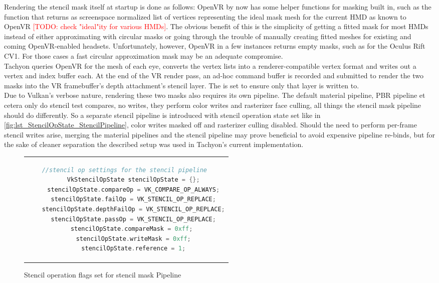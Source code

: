 Rendering the stencil mask itself at startup is done as follows: 
OpenVR by now has some helper functions for masking built in, such as the  function that returns as screenspace normalized list of vertices representing the ideal mask mesh for the current HMD as known to OpenVR \textcolor{red}{[TODO: check "ideal"ity for various HMDs]}. The obvious benefit of this is the simplicity of getting a fitted mask for most HMDs instead of either approximating with circular masks or going through the trouble of manually creating fitted meshes for existing and coming OpenVR-enabled headsets. Unfortunately, however, OpenVR in a few instances returns empty masks, such as for the Oculus Rift CV1. For those cases a fast circular approximation mask may be an adequate compromise. \\
Tachyon queries OpenVR for the mesh of each eye, converts the vertex lists into a renderer-compatible vertex format and writes out a vertex and index buffer each. 
At the end of the VR render pass, an ad-hoc command buffer is recorded and submitted to render the two masks into the VR framebuffer's depth attachment's stencil layer. The  is set to ensure only that layer is written to. \\

Due to Vulkan's verbose nature, rendering these two masks also requires its own pipeline. The default material pipeline, PBR pipeline et cetera only do stencil test compares, no writes, they perform color writes and rasterizer face culling, all things the stencil mask pipeline should do differently. So a separate stencil pipeline is introduced with stencil operation state set like in \autoref{fig:lst_StencilOpState_StencilPipeline}, color writes masked off and rasterizer culling disabled. Should the need to perform per-frame stencil writes arise, merging the material pipelines and the stencil pipeline may prove beneficial to avoid expensive pipeline re-binds, but for the sake of cleaner separation the described setup was used in Tachyon's current implementation. 

\begin{figure}[htb]
  \centering
  \begin{tabular}{c}
  \begin{lstlisting}[language=C++]
	//stencil op settings for the stencil pipeline 
	VkStencilOpState stencilOpState = {};
	stencilOpState.compareOp = VK_COMPARE_OP_ALWAYS;
	stencilOpState.failOp = VK_STENCIL_OP_REPLACE;
	stencilOpState.depthFailOp = VK_STENCIL_OP_REPLACE;
	stencilOpState.passOp = VK_STENCIL_OP_REPLACE;
	stencilOpState.compareMask = 0xff; 
	stencilOpState.writeMask = 0xff;
	stencilOpState.reference = 1;
	\end{lstlisting}
  \end{tabular}
  \caption[Stencil pipeline stencil operation flags]{Stencil operation flags set for stencil mask Pipeline}\label{fig:lst_StencilOpState_StencilPipeline}
\end{figure}
